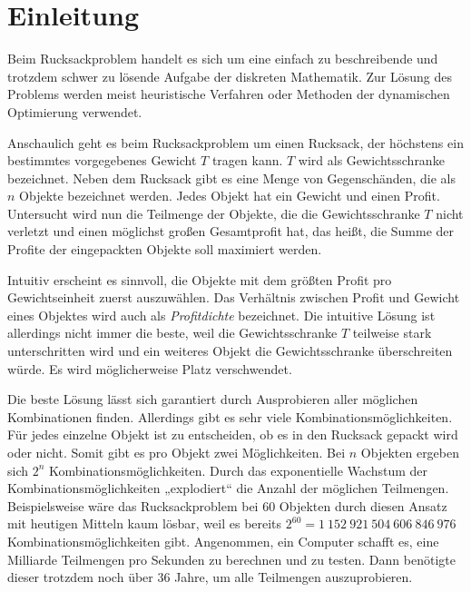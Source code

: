 \chapter{Einleitung}
\noindent Beim Rucksackproblem handelt es sich um eine einfach zu beschreibende und trotzdem schwer zu lösende Aufgabe der diskreten Mathematik.
Zur Lösung des Problems werden meist heuristische Verfahren oder Methoden der dynamischen Optimierung verwendet. \cite[vgl.][]{Luderer2017}

Anschaulich geht es beim Rucksackproblem um einen Rucksack, der höchstens ein bestimmtes vorgegebenes Gewicht $T$ tragen kann. 
$T$ wird als Gewichtsschranke bezeichnet.
Neben dem Rucksack gibt es eine Menge von Gegenschänden, die als $n$ Objekte bezeichnet werden. 
Jedes Objekt hat ein Gewicht und einen Profit. 
Untersucht wird nun die Teilmenge der Objekte, die die Gewichtsschranke $T$ nicht verletzt und einen möglichst großen Gesamtprofit hat, 
das heißt, die Summe der Profite der eingepackten Objekte soll maximiert werden.

Intuitiv erscheint es sinnvoll, die Objekte mit dem größten Profit pro Gewichtseinheit zuerst auszuwählen.
Das Verhältnis zwischen Profit und Gewicht eines Objektes wird auch als \textit{Profitdichte} bezeichnet. 
Die intuitive Lösung ist allerdings nicht immer die beste, weil die Gewichtsschranke $T$ teilweise stark unterschritten wird und ein weiteres Objekt die Gewichtsschranke überschreiten würde.
Es wird möglicherweise Platz verschwendet.

Die beste Lösung lässt sich garantiert durch Ausprobieren aller möglichen Kombinationen finden.
Allerdings gibt es sehr viele Kombinationsmöglichkeiten.
Für jedes einzelne Objekt ist zu entscheiden, ob es in den Rucksack gepackt wird oder nicht. Somit gibt es pro Objekt zwei Möglichkeiten.
Bei $n$ Objekten ergeben sich $2^n$ Kombinationsmöglichkeiten. Durch das exponentielle Wachstum der Kombinationsmöglichkeiten „explodiert“ die Anzahl der möglichen Teilmengen. Beispielsweise wäre das Rucksackproblem bei 60 Objekten durch diesen Ansatz mit heutigen Mitteln kaum lösbar, weil es bereits $2^{60} = 1 \ 152\ 921\ 504\ 606\ 846\ 976$ Kombinationsmöglichkeiten gibt. Angenommen, ein Computer schafft es, eine Milliarde Teilmengen pro Sekunden zu berechnen und zu testen. Dann benötigte dieser trotzdem noch über 36 Jahre, um alle Teilmengen auszuprobieren. \cite[vgl.][]{Vocking2008}

